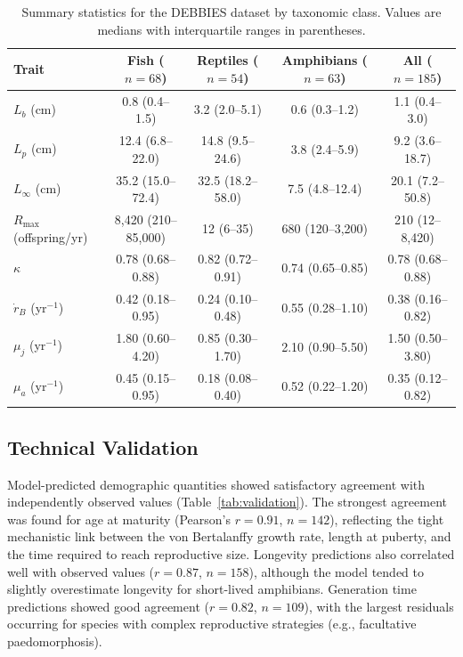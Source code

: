 \documentclass[11pt]{article}
\begin{document}
\begin{table}[t]
\centering
\caption{Summary statistics for the DEBBIES dataset by taxonomic class. Values are medians with interquartile ranges in parentheses.}
\label{tab:summary}
\begin{tabular}{@{}lcccc@{}}
\toprule
Trait & Fish ($n=68$) & Reptiles ($n=54$) & Amphibians ($n=63$) & All ($n=185$) \\
\midrule
$L_b$ (cm)                 & 0.8 (0.4--1.5)     & 3.2 (2.0--5.1)     & 0.6 (0.3--1.2)     & 1.1 (0.4--3.0)     \\
$L_p$ (cm)                 & 12.4 (6.8--22.0)   & 14.8 (9.5--24.6)   & 3.8 (2.4--5.9)     & 9.2 (3.6--18.7)    \\
$L_\infty$ (cm)            & 35.2 (15.0--72.4)  & 32.5 (18.2--58.0)  & 7.5 (4.8--12.4)    & 20.1 (7.2--50.8)   \\
$R_{\max}$ (offspring/yr)  & 8,420 (210--85,000) & 12 (6--35)         & 680 (120--3,200)    & 210 (12--8,420)     \\
$\kappa$                   & 0.78 (0.68--0.88)  & 0.82 (0.72--0.91)  & 0.74 (0.65--0.85)  & 0.78 (0.68--0.88)  \\
$\dot{r}_B$ (yr$^{-1}$)   & 0.42 (0.18--0.95)  & 0.24 (0.10--0.48)  & 0.55 (0.28--1.10)  & 0.38 (0.16--0.82)  \\
$\mu_j$ (yr$^{-1}$)       & 1.80 (0.60--4.20)  & 0.85 (0.30--1.70)  & 2.10 (0.90--5.50)  & 1.50 (0.50--3.80)  \\
$\mu_a$ (yr$^{-1}$)       & 0.45 (0.15--0.95)  & 0.18 (0.08--0.40)  & 0.52 (0.22--1.20)  & 0.35 (0.12--0.82)  \\
\bottomrule
\end{tabular}
\end{table}

\subsection{Technical Validation}

Model-predicted demographic quantities showed satisfactory agreement with independently observed values (Table~\ref{tab:validation}). The strongest agreement was found for age at maturity (Pearson's $r = 0.91$, $n = 142$), reflecting the tight mechanistic link between the von Bertalanffy growth rate, length at puberty, and the time required to reach reproductive size. Longevity predictions also correlated well with observed values ($r = 0.87$, $n = 158$), although the model tended to slightly overestimate longevity for short-lived amphibians. Generation time predictions showed good agreement ($r = 0.82$, $n = 109$), with the largest residuals occurring for species with complex reproductive strategies (e.g., facultative paedomorphosis).
\end{document}
